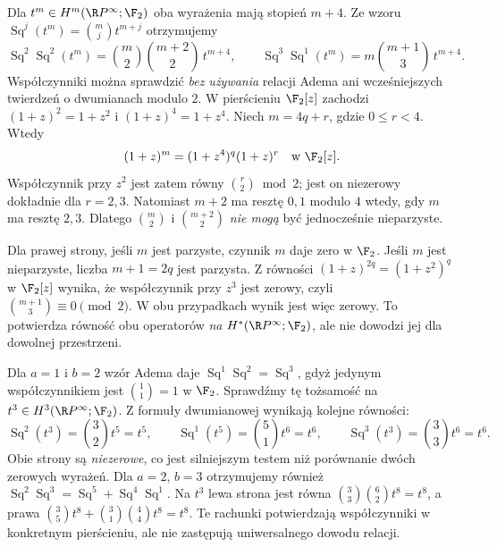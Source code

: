 \begin{przyklad}[Sprawdzenie relacji $\operatorname{Sq}^2\operatorname{Sq}^2
=\operatorname{Sq}^3\operatorname{Sq}^1$ w niskich stopniach]
\label{prz:adem-rp-niskie-v8}
Dla $t^m\in H^m(\R P^\infty;\F_2)$
oba wyrażenia mają stopień $m+4$.
Ze wzoru $\operatorname{Sq}^j(t^m)=\binom mj t^{m+j}$
otrzymujemy
\[
 \operatorname{Sq}^2\operatorname{Sq}^2(t^m)
  =\binom m2\binom{m+2}2\,t^{m+4},
 \qquad
 \operatorname{Sq}^3\operatorname{Sq}^1(t^m)
  =m\binom{m+1}3\,t^{m+4}.
\]
Współczynniki można sprawdzić \emph{bez używania}
relacji Adema ani wcześniejszych twierdzeń o
dwumianach modulo $2$.
W pierścieniu $\F_2[z]$ zachodzi
$(1+z)^2=1+z^2$ i
$(1+z)^4=1+z^4$.
Niech $m=4q+r$, gdzie $0\le r<4$.
Wtedy
\[
 (1+z)^m=(1+z^4)^q(1+z)^r
 \quad\text{w }\F_2[z].
\]
Współczynnik przy $z^2$ jest zatem równy
$\binom r2\bmod2$; jest on niezerowy
dokładnie dla $r=2,3$.
Natomiast $m+2$ ma resztę $0,1$ modulo $4$
wtedy, gdy $m$ ma resztę $2,3$.
Dlatego $\binom m2$ i $\binom{m+2}2$
\emph{nie mogą} być jednocześnie nieparzyste.

Dla prawej strony, jeśli $m$ jest parzyste,
czynnik $m$ daje zero w $\F_2$.
Jeśli $m$ jest nieparzyste, liczba
$m+1=2q$ jest parzysta.
Z równości $(1+z)^{2q}=(1+z^2)^q$
w $\F_2[z]$ wynika, że współczynnik
przy $z^3$ jest zerowy, czyli
$\binom{m+1}3\equiv0\pmod2$.
W obu przypadkach wynik jest więc zerowy.
To potwierdza równość obu operatorów
\emph{na} $H^*(\R P^\infty;\F_2)$,
ale nie dowodzi jej dla dowolnej przestrzeni.
\end{przyklad}

\begin{przyklad}
\label{prz:adem-niezerowy-v8}
Dla $a=1$ i $b=2$ wzór Adema daje
$\operatorname{Sq}^1\operatorname{Sq}^2=\operatorname{Sq}^3$,
gdyż jedynym współczynnikiem jest $\binom11=1$ w $\F_2$.
Sprawdźmy tę tożsamość na $t^3\in H^3(\R P^\infty;\F_2)$.
Z formuły dwumianowej wynikają kolejne równości:
\[
 \operatorname{Sq}^2(t^3)=\binom32t^5=t^5,
 \qquad\operatorname{Sq}^1(t^5)=\binom51t^6=t^6,
 \qquad\operatorname{Sq}^3(t^3)=\binom33t^6=t^6.
\]
Obie strony są \emph{niezerowe}, co jest silniejszym testem niż
porównanie dwóch zerowych wyrażeń. Dla $a=2$, $b=3$
otrzymujemy również
$\operatorname{Sq}^2\operatorname{Sq}^3
=\operatorname{Sq}^5+\operatorname{Sq}^4\operatorname{Sq}^1$.
Na $t^3$ lewa strona jest równa
$\binom33\binom62t^8=t^8$, a prawa
$\binom35t^8+\binom31\binom44t^8=t^8$.
Te rachunki potwierdzają współczynniki w konkretnym
pierścieniu, ale nie zastępują uniwersalnego dowodu relacji.
\end{przyklad}

